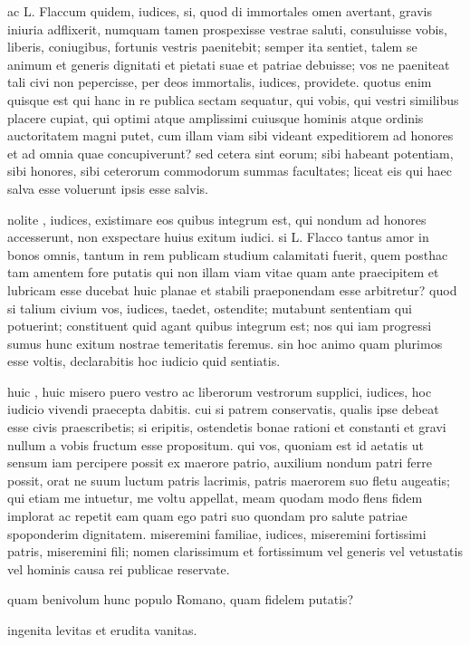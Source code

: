  ac L. Flaccum quidem, iudices, si, quod di immortales omen avertant, gravis iniuria adflixerit, numquam tamen prospexisse vestrae saluti, consuluisse vobis, liberis, coniugibus, fortunis vestris paenitebit; semper ita sentiet, talem se animum et generis dignitati et pietati suae et patriae debuisse; vos ne paeniteat tali civi non pepercisse, per deos immortalis, iudices, providete. quotus enim quisque est qui hanc in re publica sectam sequatur, qui vobis, qui vestri similibus placere cupiat, qui optimi atque amplissimi cuiusque hominis atque ordinis auctoritatem magni putet, cum illam viam sibi videant expeditiorem ad honores et ad omnia quae concupiverunt? sed cetera sint eorum; sibi habeant potentiam, sibi honores, sibi ceterorum commodorum summas facultates; liceat eis qui haec salva esse voluerunt ipsis esse salvis.

 nolite , iudices, existimare eos quibus integrum est, qui nondum ad honores accesserunt, non exspectare huius exitum iudici. si L. Flacco tantus amor in bonos omnis, tantum in rem publicam studium calamitati fuerit, quem posthac tam amentem fore putatis qui non illam viam vitae quam ante praecipitem et lubricam esse ducebat huic planae et stabili praeponendam esse arbitretur? quod si talium civium vos, iudices, taedet, ostendite; mutabunt sententiam qui potuerint; constituent quid agant quibus integrum est; nos qui iam progressi sumus hunc exitum nostrae temeritatis feremus. sin hoc animo quam plurimos esse voltis, declarabitis hoc iudicio quid sentiatis.

 huic , huic misero puero vestro ac liberorum vestrorum supplici, iudices, hoc iudicio vivendi praecepta dabitis. cui si patrem conservatis, qualis ipse debeat esse civis praescribetis; si eripitis, ostendetis bonae rationi et constanti et gravi nullum a vobis fructum esse propositum. qui vos, quoniam est id aetatis ut sensum iam percipere possit ex maerore patrio, auxilium nondum patri ferre possit, orat ne suum luctum patris lacrimis, patris maerorem suo fletu augeatis; qui etiam me intuetur, me voltu appellat, meam quodam modo flens fidem implorat ac repetit eam quam ego patri suo quondam pro salute patriae spoponderim dignitatem. miseremini familiae, iudices, miseremini fortissimi patris, miseremini fili; nomen clarissimum et fortissimum vel generis vel vetustatis vel hominis causa rei publicae reservate.

 quam benivolum hunc populo Romano, quam fidelem putatis?

 ingenita levitas et erudita vanitas.
